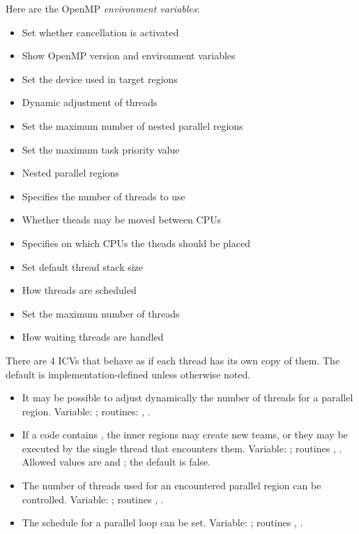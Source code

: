 Here are the OpenMP \emph{environment variables}:
\begin{itemize}
\item {} Set whether cancellation is activated
\item {} Show OpenMP version and environment variables
\item {} Set the device used in target regions
\item {} Dynamic adjustment of threads
\item {} Set the maximum number of nested parallel
  regions
\item {} Set the maximum task priority value
\item {} Nested parallel regions
\item {} Specifies the number of threads to use
\item {} Whether theads may be moved between CPUs
\item {} Specifies on which CPUs the theads should be placed
\item {} Set default thread stack size
\item {} How threads are scheduled
\item {} Set the maximum number of threads
\item {} How waiting threads are handled
\end{itemize}

There are 4 \acp{ICV} that behave as if each thread has its own copy of them.
The default is implementation-defined unless otherwise noted.
\begin{itemize}
  \item It may be possible to adjust dynamically the number of threads
    for a parallel region. Variable: ;
    routines: ,
    .
  \item If a code contains ,
    the inner regions may create new teams, or they may be executed by
    the single thread that encounters them. Variable:
    ; routines ,
    . Allowed values are  and
    ; the default is false.
  \item The number of threads used for an encountered parallel region
    can be controlled. Variable: ;
    routines ,
    .
  \item The schedule for a parallel loop can be set. Variable:
    ; routines
    , .
\end{itemize}

